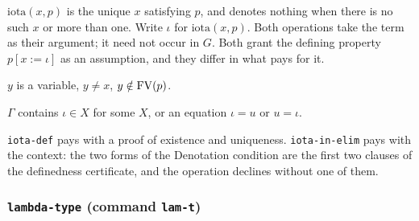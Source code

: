 $\mathrm{iota}(x, p)$ is the unique $x$ satisfying $p$, and denotes
nothing when there is no such $x$ or more than one.  Write $\iota$ for
$\mathrm{iota}(x, p)$.  Both operations take the term as their argument;
it need not occur in $G$.  Both grant the defining property
$p[x{:=}\iota]$ as an assumption, and they differ in what pays for it.
\label{kop:iota-def}%
\begin{VNBcond}
\item[Freshness] $y$ is a variable, $y \neq x$, $y \notin \mathrm{FV}(p)$.
\end{VNBcond}
\label{kop:iota-in-elim}%
\begin{VNBcond}
\item[Denotation] $\Gamma$ contains $\iota \in X$ for some $X$, or an
  equation $\iota = u$ or $u = \iota$.
\end{VNBcond}
\texttt{iota-def} pays with a proof of existence and uniqueness.
\texttt{iota-in-elim} pays with the context: the two forms of the
Denotation condition are the first two clauses of the definedness
certificate, and the operation declines without one of them.

\subsubsection*{\texttt{lambda-type} (command \texttt{lam-t})}

